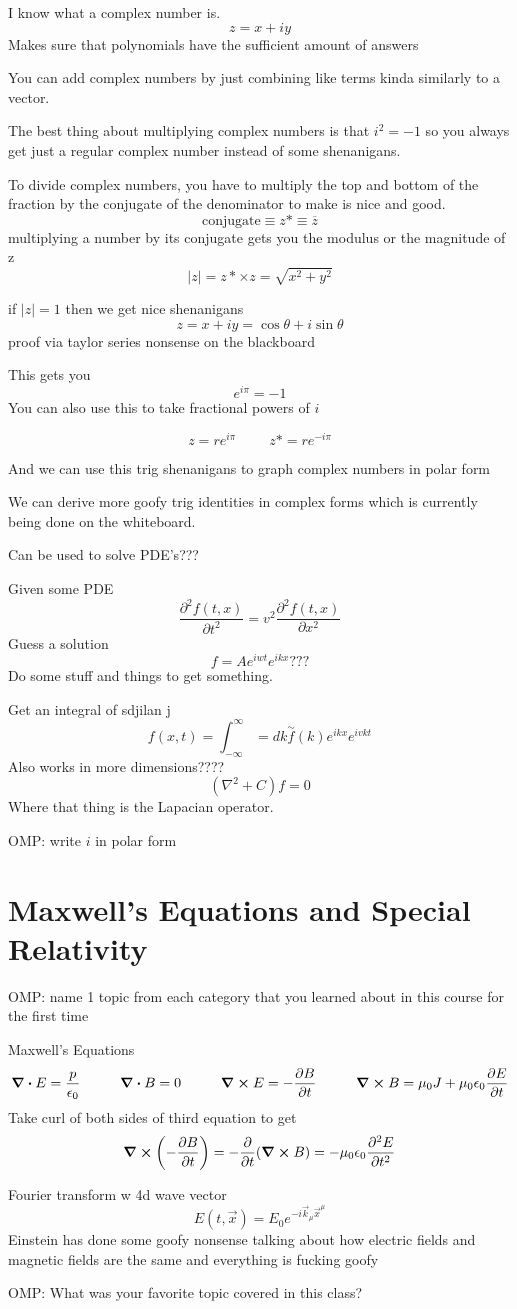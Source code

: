 \documentclass{report}
\newcommand{\hp}{\hspace{1cm}}
\newcommand{\del}{\partial}
\newcommand{\pdif}[2]{ \frac{\partial #1}{ \partial #2} }
\begin{document}
I know what a complex number is.
\[
z = x + iy
\]
Makes sure that polynomials have the sufficient amount of answers

You can add complex numbers by just combining like terms kinda similarly to a vector.

The best thing about multiplying complex numbers is that $i^2 = -1$ so you always get just a regular complex number instead of some shenanigans.

To divide complex numbers, you have to multiply the top and bottom of the fraction by the conjugate of the denominator to make is nice and good.
\[
\textrm{conjugate} \equiv z* \equiv \overline z
\]
multiplying a number by its conjugate gets you the modulus or the magnitude of z
\[
|z| = z* \times z = \sqrt{x^2 + y^2}
\]


if $|z| = 1$ then we get nice shenanigans
\[
z = x + iy = \cos \theta + i \sin \theta
\]
proof via taylor series nonsense on the blackboard

This gets you
\[
e^{i \pi} = -1 
\]
You can also use this to take fractional powers of $i$

\[
z = re^{i \pi} \hp z* = re^{-i \pi}
\]

And we can use this trig shenanigans to graph complex numbers in polar form

We can derive more goofy trig identities in complex forms which is currently being done on the whiteboard.

Can be used to solve PDE's???

Given some PDE
\[
\frac{ \del^2 f(t, x)}{\del t^2} 
=
v^2 
\frac{\del^2 f(t, x)}{\del x^2}
\]
Guess a solution
\[
f = Ae^{iwt}e^{ikx} ???
\]
Do some stuff and things to get something.

Get an integral of sdjilan j
\[
f(x, t) = \int^\infty_{-\infty} = dk \overset{\sim}{f} (k)e^{ikx} e^{ivkt}
\]
Also works in more dimensions????
\[
(\nabla^2 + C)f = 0
\]
Where that thing is the Lapacian operator.

OMP:
write $i$ in polar form


\chapter{Maxwell's Equations and Special Relativity}
OMP: 
name 1 topic from each category that you learned about in this course for the first time

Maxwell's Equations
\[
\div E = \frac{p}{\epsilon_0}
\hp
\div B = 0
\hp 
\curl E = -\pdif{B}{t}
\hp
\curl B = \mu_0 J + \mu_0 \epsilon_0 \pdif{E}{t}
\]
Take curl of both sides of third equation to get
\[
\curl \left( - \pdif{B}{t} \right) = - \pdif{}{t} (\curl B)
=
-\mu_0 \epsilon_0 \pdif{^2 E}{t^2}
\]


Fourier transform w 4d wave vector
\[
E(t, \vec x) = E_0 e^{-i \vec k_\mu \vec x^\mu}
\]
Einstein has done some goofy nonsense talking about how electric fields and magnetic fields are the same and everything is fucking goofy

OMP: What was your favorite topic covered in this class?
\end{document}
